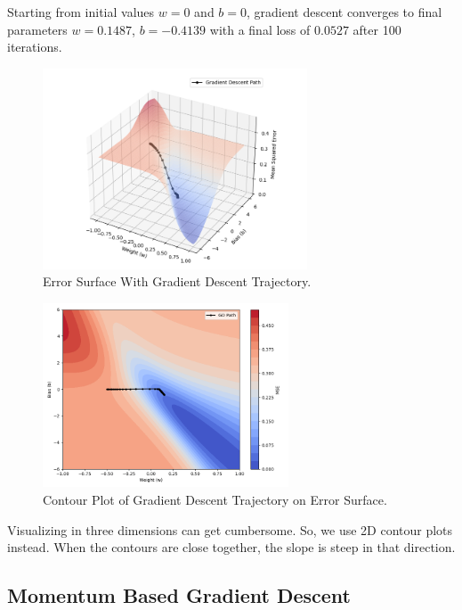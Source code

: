 Starting from initial values \( w = 0 \) and \( b = 0 \), gradient descent converges to final parameters \( w = 0.1487 \), \( b = -0.4139 \) with a final loss of \( 0.0527 \) after 100 iterations.\newpage

\begin{figure}[h!]
    \centering
    \includegraphics[width=0.7\textwidth]{content/section01/chapter01/figs/error_surface_grad_desc.png}
    \caption{Error Surface With Gradient Descent Trajectory.}
    \label{fig:gd_trajectory}
\end{figure}

\begin{figure}[h!]
    \centering
    \includegraphics[width=0.65\textwidth]{content/section01/chapter01/figs/grad_desc_contour.png}
    \caption{Contour Plot of Gradient Descent Trajectory on Error Surface.}
\end{figure}

Visualizing in three dimensions can get cumbersome. So, we use 2D contour plots instead.  When the contours are close together, the slope is steep in that direction.  


\subsection{Momentum Based Gradient Descent}

